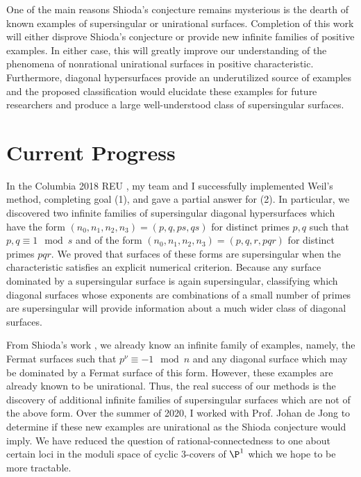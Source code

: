 \documentclass[12pt]{amsart}
\begin{document}
One of the main reasons Shioda's conjecture remains mysterious is the dearth of known examples of supersingular or unirational surfaces. Completion of this work will either disprove Shioda's conjecture or provide new infinite families of positive examples. In either case, this will greatly improve our understanding of the phenomena of nonrational unirational surfaces in positive characteristic. Furthermore, diagonal hypersurfaces provide an underutilized source of examples and the proposed classification would elucidate these examples for future researchers and produce a large well-understood class of supersingular surfaces.

\section*{Current Progress}

In the Columbia 2018 REU \cite{REU}, my team and I successfully implemented Weil's method, completing goal (1), and gave a partial answer for (2). In particular, we discovered two infinite families of supersingular diagonal hypersurfaces which have the form $(n_0, n_1, n_2, n_3) = (p, q, ps, qs)$ for distinct primes $p,q$ such that $p,q \equiv 1 \mod s$ and of the form $(n_0, n_1, n_2, n_3) = (p, q, r, pqr)$ for distinct primes $pqr$. We proved that surfaces of these forms are supersingular when the characteristic satisfies an explicit numerical criterion. Because any surface dominated by a supersingular surface is again supersingular, classifying which diagonal surfaces whose exponents are combinations of a small number of primes are supersingular will provide information about a much wider class of diagonal surfaces.  
\par
From Shioda's work \cite{shioda_on_fermat}, we already know an infinite family of examples, namely, the Fermat surfaces such that $p^\nu \equiv - 1 \mod n$ and any diagonal surface which may be dominated by a Fermat surface of this form. However, these examples are already known to be unirational. Thus, the real success of our methods is the discovery of additional infinite families of supersingular surfaces which are not of the above form. Over the summer of 2020, I worked with Prof. Johan de Jong to determine if these new examples are unirational as the Shioda conjecture would imply. We have reduced the question of rational-connectedness to one about certain loci in the moduli space of cyclic $3$-covers of $\P^1$ which we hope to be more tractable. 




\newpage



\end{document}
